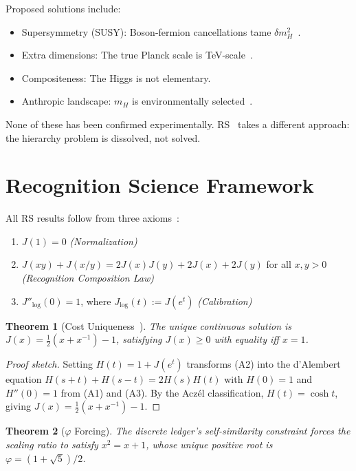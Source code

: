 \documentclass[12pt,a4paper]{article}
\newtheorem{theorem}{Theorem}[section]
\theoremstyle{definition}
\theoremstyle{remark}
\begin{document}
Proposed solutions include:
\begin{itemize}
  \item Supersymmetry (SUSY): Boson-fermion cancellations tame
  $\delta m_H^2$~\cite{Martin1998}.
  \item Extra dimensions: The true Planck scale is
  TeV-scale~\cite{ArkaniHamed1998}.
  \item Compositeness: The Higgs is not elementary.
  \item Anthropic landscape: $m_H$ is environmentally
  selected~\cite{Bousso2000}.
\end{itemize}

None of these has been confirmed experimentally.  RS~\cite{RS_Axioms} takes a different approach: the hierarchy
problem is dissolved, not solved.

\section{Recognition Science Framework}
\label{sec:framework}

All RS results follow from three axioms~\cite{RS_Axioms}:
\begin{enumerate}[label=(A\arabic*),nosep]
  \item $J(1) = 0$ \hfill\textit{(Normalization)}
  \item $J(xy) + J(x/y) = 2J(x)J(y) + 2J(x) + 2J(y)$ for all $x, y > 0$
  \hfill\textit{(Recognition Composition Law)}
  \item $J''_{\log}(0) = 1$, where $J_{\log}(t) := J(e^t)$
  \hfill\textit{(Calibration)}
\end{enumerate}

\begin{theorem}[Cost Uniqueness~\cite{RS_Axioms}]
\label{thm:J}
The unique continuous solution is
$J(x) = \tfrac{1}{2}(x + x^{-1}) - 1$,
satisfying $J(x) \geq 0$ with equality iff $x = 1$.
\end{theorem}

\begin{proof}[Proof sketch]
Setting $H(t) = 1 + J(e^t)$ transforms (A2) into the
d'Alembert equation $H(s+t)+H(s-t) = 2H(s)H(t)$ with $H(0)=1$
and $H''(0)=1$ from (A1) and (A3).  By the Acz\'el classification,
$H(t)=\cosh t$, giving $J(x) = \tfrac{1}{2}(x+x^{-1})-1$.
\end{proof}

\begin{theorem}[$\varphi$ Forcing]
\label{thm:phi}
The discrete ledger's self-similarity constraint forces the scaling
ratio to satisfy $x^2 = x + 1$, whose unique positive root is
$\varphi = (1+\sqrt{5})/2$.
\end{theorem}
\end{document}
